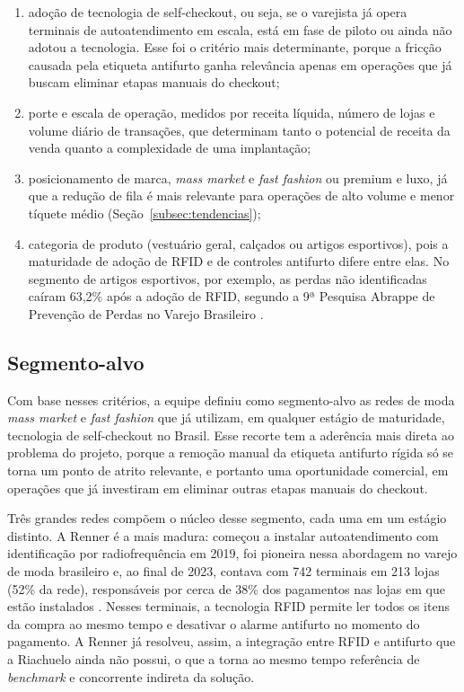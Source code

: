 \begin{enumerate}[label=\alph*)]
    \item adoção de tecnologia de self-checkout, ou seja, se o varejista já opera terminais de autoatendimento em escala, está em fase de piloto ou ainda não adotou a tecnologia. Esse foi o critério mais determinante, porque a fricção causada pela etiqueta antifurto ganha relevância apenas em operações que já buscam eliminar etapas manuais do checkout;
    \item porte e escala de operação, medidos por receita líquida, número de lojas e volume diário de transações, que determinam tanto o potencial de receita da venda quanto a complexidade de uma implantação;
    \item posicionamento de marca, \textit{mass market} e \textit{fast fashion} ou premium e luxo, já que a redução de fila é mais relevante para operações de alto volume e menor tíquete médio (Seção~\ref{subsec:tendencias});
    \item categoria de produto (vestuário geral, calçados ou artigos esportivos), pois a maturidade de adoção de RFID e de controles antifurto difere entre elas. No segmento de artigos esportivos, por exemplo, as perdas não identificadas caíram 63,2\% após a adoção de RFID, segundo a 9ª Pesquisa Abrappe de Prevenção de Perdas no Varejo Brasileiro \cite{cartacapital2026perdas}.
\end{enumerate}

\subsection{Segmento-alvo}
\label{subsec:segmento_alvo}

Com base nesses critérios, a equipe definiu como segmento-alvo as redes de moda \textit{mass market} e \textit{fast fashion} que já utilizam, em qualquer estágio de maturidade, tecnologia de self-checkout no Brasil. Esse recorte tem a aderência mais direta ao problema do projeto, porque a remoção manual da etiqueta antifurto rígida só se torna um ponto de atrito relevante, e portanto uma oportunidade comercial, em operações que já investiram em eliminar outras etapas manuais do checkout.

Três grandes redes compõem o núcleo desse segmento, cada uma em um estágio distinto. A Renner é a mais madura: começou a instalar autoatendimento com identificação por radiofrequência em 2019, foi pioneira nessa abordagem no varejo de moda brasileiro e, ao final de 2023, contava com 742 terminais em 213 lojas (52\% da rede), responsáveis por cerca de 38\% dos pagamentos nas lojas em que estão instalados \cite{fashionnetwork2024renner,consumidormoderno2025renner}. Nesses terminais, a tecnologia RFID permite ler todos os itens da compra ao mesmo tempo e desativar o alarme antifurto no momento do pagamento. A Renner já resolveu, assim, a integração entre RFID e antifurto que a Riachuelo ainda não possui, o que a torna ao mesmo tempo referência de \textit{benchmark} e concorrente indireta da solução.

